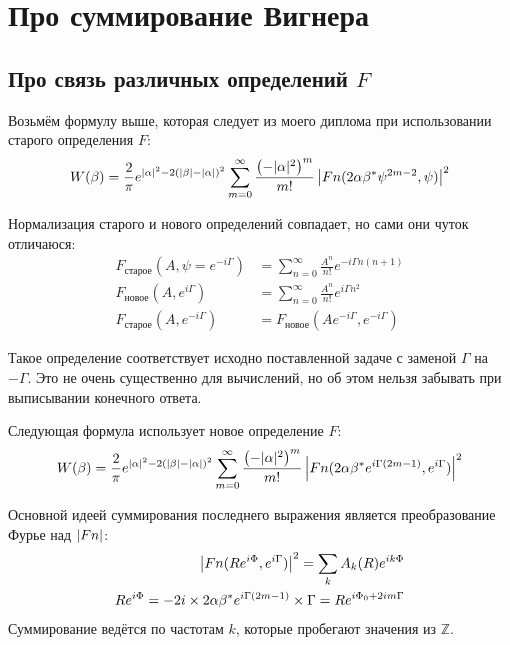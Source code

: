 \documentclass[a4paper, 12pt]{article}
\newenvironment{eqw}{\begin{equation} \begin{aligned}}   
    {\end{aligned}    \end{equation}}
\begin{document}
\section{Про суммирование Вигнера}
\subsection*{Про связь различных определений $F$}
Возьмём формулу выше, которая следует из моего диплома при использовании старого определения $F$:
\begin{equation}\label{QtoW}
	\begin{aligned}
		W(\beta) = \frac{2}{\pi}e^{\abs{\alpha}^2-2\left(\abs{\beta} - \abs{\alpha}\right)^2}\sum\limits_{m=0}^{\infty} \frac{\left(-|\alpha|^2\right)^m}{m!}\left|Fn(2\alpha \beta^*\psi^{2m-2}, \psi)\right|^2
	\end{aligned}
\end{equation}

Нормализация старого и нового определений совпадает, но сами они чуток отличаюся:
\begin{eqw}
     F_{\text{старое}}(A, \psi = e^{-i\Gamma}) &= \sum\limits_{n=0}^{\infty} \frac{A^n}{n!}e^{-i\Gamma n(n+1)}\\
     F_{\text{новое}}(A, e^{i\Gamma}) &= \sum\limits_{n=0}^{\infty} \frac{A^n}{n!}e^{i\Gamma n^2}\\
     F_{\text{старое}}(A, e^{-i\Gamma}) &= F_{\text{новое}}(Ae^{-i\Gamma}, e^{-i\Gamma})
\end{eqw}

Такое определение соответствует исходно поставленной задаче с заменой $\Gamma$ на $-\Gamma$. Это не очень существенно для вычислений, но об этом нельзя забывать при выписывании конечного ответа.

Следующая формула использует новое определение $F$:
\begin{eqw}
    W(\beta) = \frac{2}{\pi}e^{\abs{\alpha}^2-2\left(\abs{\beta} - \abs{\alpha}\right)^2}\sum\limits_{m=0}^{\infty} \frac{\left(-|\alpha|^2\right)^m}{m!}\left|Fn(2\alpha \beta^*e^{i\Gamma(2m-1)}, e^{i\Gamma})\right|^2
\end{eqw}

Основной идеей суммирования последнего выражения является преобразование Фурье над $\abs{Fn}$:
\begin{eqw}
    \abs{Fn(Re^{i\Phi}, e^{i\Gamma})}^2 = \sum\limits_k A_k(R)e^{ik\Phi}\\
    Re^{i\Phi} = -2i\times 2\alpha \beta^*e^{i\Gamma(2m-1)}\times \Gamma = Re^{i\Phi_0+2im\Gamma}
\end{eqw}
Суммирование ведётся по частотам $k$, которые пробегают значения из $\mathbb{Z}$.
\end{document}
